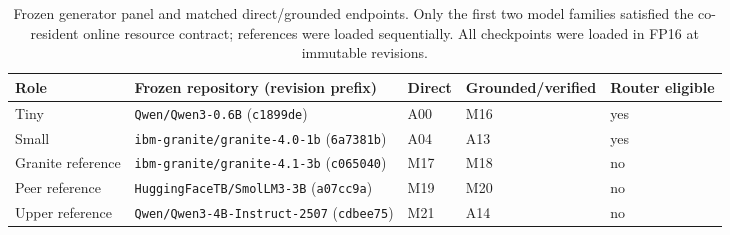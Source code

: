 \begin{table}[t]
\caption{Frozen generator panel and matched direct/grounded endpoints. Only the first two model families satisfied the co-resident online resource contract; references were loaded sequentially. All checkpoints were loaded in FP16 at immutable revisions.}
\label{tab:model-panel}
\centering
\small
\begin{tabularx}{\textwidth}{@{}lXlll@{}}
\toprule
Role & Frozen repository (revision prefix) & Direct & Grounded/verified & Router eligible \\
\midrule
Tiny & \texttt{Qwen/Qwen3-0.6B} (\texttt{c1899de}) & A00 & M16 & yes \\
Small & \texttt{ibm-granite/granite-4.0-1b} (\texttt{6a7381b}) & A04 & A13 & yes \\
Granite reference & \texttt{ibm-granite/granite-4.1-3b} (\texttt{c065040}) & M17 & M18 & no \\
Peer reference & \texttt{HuggingFaceTB/SmolLM3-3B} (\texttt{a07cc9a}) & M19 & M20 & no \\
Upper reference & \texttt{Qwen/Qwen3-4B-Instruct-2507} (\texttt{cdbee75}) & M21 & A14 & no \\
\bottomrule
\end{tabularx}
\end{table}
